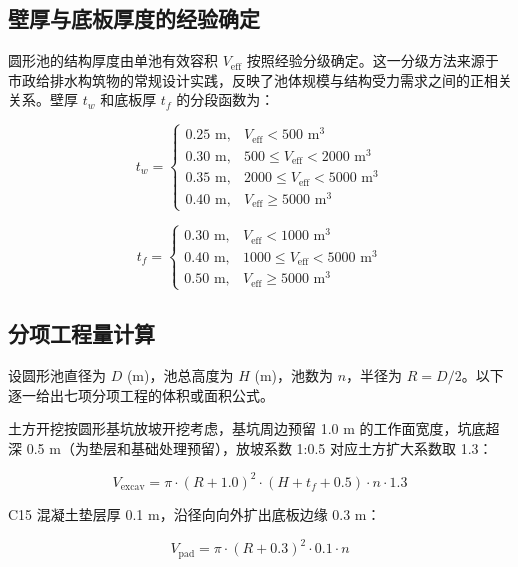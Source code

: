 \documentclass[12pt,a4paper]{ctexart}
\begin{document}
\subsection{壁厚与底板厚度的经验确定}

圆形池的结构厚度由单池有效容积 $V_{\text{eff}}$ 按照经验分级确定。这一分级方法来源于市政给排水构筑物的常规设计实践，反映了池体规模与结构受力需求之间的正相关关系。壁厚 $t_w$ 和底板厚 $t_f$ 的分段函数为：

\begin{equation}
t_w = \begin{cases}
0.25\text{ m}, & V_{\text{eff}} < 500\text{ m}^3 \\
0.30\text{ m}, & 500 \le V_{\text{eff}} < 2000\text{ m}^3 \\
0.35\text{ m}, & 2000 \le V_{\text{eff}} < 5000\text{ m}^3 \\
0.40\text{ m}, & V_{\text{eff}} \ge 5000\text{ m}^3
\end{cases}
\end{equation}

\begin{equation}
t_f = \begin{cases}
0.30\text{ m}, & V_{\text{eff}} < 1000\text{ m}^3 \\
0.40\text{ m}, & 1000 \le V_{\text{eff}} < 5000\text{ m}^3 \\
0.50\text{ m}, & V_{\text{eff}} \ge 5000\text{ m}^3
\end{cases}
\end{equation}

\subsection{分项工程量计算}

设圆形池直径为 $D$ (m)，池总高度为 $H$ (m)，池数为 $n$，半径为 $R = D/2$。以下逐一给出七项分项工程的体积或面积公式。

土方开挖按圆形基坑放坡开挖考虑，基坑周边预留 1.0 m 的工作面宽度，坑底超深 0.5 m（为垫层和基础处理预留），放坡系数 1:0.5 对应土方扩大系数取 1.3：

\begin{equation}
V_{\text{excav}} = \pi \cdot (R + 1.0)^2 \cdot (H + t_f + 0.5) \cdot n \cdot 1.3
\end{equation}

C15 混凝土垫层厚 0.1 m，沿径向向外扩出底板边缘 0.3 m：

\begin{equation}
V_{\text{pad}} = \pi \cdot (R + 0.3)^2 \cdot 0.1 \cdot n
\end{equation}
\end{document}

